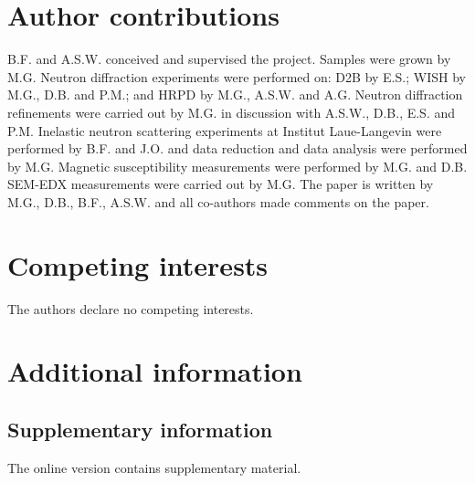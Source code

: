 \documentclass[
sn-nature,
Numbered,
iicol]
{sn-jnl}%
\begin{document}
\section{Author contributions}
B.F. and A.S.W. conceived and supervised the project. 
Samples were grown by M.G. 
Neutron diffraction experiments were performed on: D2B by E.S.; WISH by M.G., D.B. and P.M.; and HRPD by M.G., A.S.W. and A.G. 
Neutron diffraction refinements were carried out by M.G. in discussion with A.S.W., D.B., E.S. and P.M. 
Inelastic neutron scattering experiments at Institut Laue-Langevin were performed by B.F. and J.O. and data reduction and data analysis were performed by M.G. 
Magnetic susceptibility measurements were performed by M.G. and D.B. 
SEM-EDX measurements were carried out by M.G. 
The paper is written by M.G., D.B., B.F., A.S.W. and all co-authors made comments on the paper.

\section{Competing interests}
The authors declare no competing interests.

\section{Additional information}
\subsection{Supplementary information}
The online version contains supplementary material.
\end{document}

